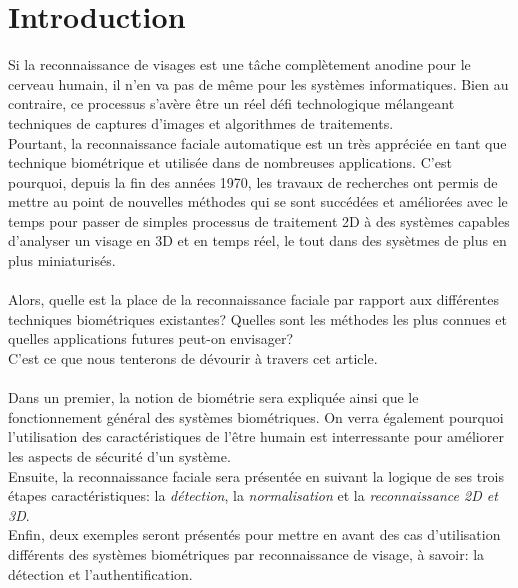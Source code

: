 \section{Introduction}
Si la reconnaissance de visages est une tâche complètement anodine pour le cerveau humain, il n'en va pas de même pour les systèmes informatiques. Bien au contraire, ce processus s'avère être un réel défi technologique mélangeant techniques de captures d'images et algorithmes de traitements. \\
Pourtant, la reconnaissance faciale automatique est un très appréciée en tant que technique biométrique et utilisée dans de nombreuses applications. C'est pourquoi, depuis la fin des années 1970, les travaux de recherches ont permis de mettre au point de nouvelles méthodes qui se sont succédées et améliorées avec le temps pour passer de simples processus de traitement 2D à des systèmes capables d'analyser un visage en 3D et en temps réel, le tout dans des sysètmes de plus en plus miniaturisés.
\paragraph{}
Alors, quelle est la place de la reconnaissance faciale par rapport aux différentes techniques biométriques existantes? Quelles sont les méthodes les plus connues et quelles applications futures peut-on envisager?\\ C'est ce que nous tenterons de dévourir à travers cet article.
\paragraph{}
Dans un premier, la notion de biométrie sera expliquée ainsi que le fonctionnement général des systèmes biométriques. On verra également pourquoi l'utilisation des caractéristiques de l'être humain est interressante pour améliorer les aspects de sécurité d'un système.
\\
Ensuite, la reconnaissance faciale sera présentée en suivant la logique de ses trois étapes caractéristiques: la \textit{détection}, la \textit{normalisation} et la \textit{reconnaissance 2D et 3D}.
\\
Enfin, deux exemples seront présentés pour mettre en avant des cas d'utilisation différents des systèmes biométriques par reconnaissance de visage, à savoir: la détection et l'authentification.